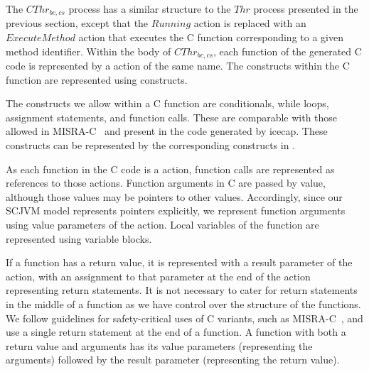 The $CThr_{bc,cs}$ process has a similar structure to the $Thr$
process presented in the previous section, except that the $Running$
action is replaced with an $ExecuteMethod$ action that executes the C
function corresponding to a given method identifier.
Within the body of $CThr_{bc,cs}$, each function of the generated C
code is represented by a \Circus{} action of the same name.
The constructs within the C function are represented using \Circus{}
constructs.

The constructs we allow within a C function are conditionals, while
loops, assignment statements, and function calls.
These are comparable with those allowed in MISRA-C~\cite{MISRA} and
present in the code generated by icecap.
These constructs can be represented by the corresponding constructs in
\Circus{}.

As each function in the C code is a \Circus{} action, function calls
are represented as references to those actions.
Function arguments in C are passed by value, although those values may
be pointers to other values.
Accordingly, since our SCJVM model represents pointers explicitly, we
represent function arguments using value parameters of the \Circus{}
action.
Local variables of the function are represented using \Circus{}
variable blocks.

If a function has a return value, it is represented with a result
parameter of the \Circus{} action, with an assignment to that
parameter at the end of the action representing return statements. 
It is not necessary to cater for return statements in the middle of a
function as we have control over the structure of the functions.
We follow guidelines for safety-critical uses of C variants, such as
MISRA-C~\cite{MISRA}, and use a single return statement at the end of
a function.
A function with both a return value and arguments has its value
parameters (representing the arguments) followed by the result
parameter (representing the return value).


